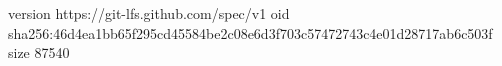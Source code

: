 version https://git-lfs.github.com/spec/v1
oid sha256:46d4ea1bb65f295cd45584be2c08e6d3f703c57472743c4e01d28717ab6c503f
size 87540
